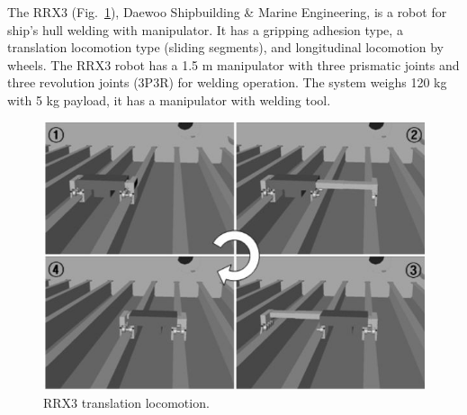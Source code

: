 The RRX3 (Fig.~\ref{rrx3}), Daewoo Shipbuilding \& Marine Engineering, is a
robot for ship's hull welding with manipulator. It has a gripping adhesion
type, a translation locomotion type (sliding segments), and
longitudinal locomotion by wheels. The RRX3 robot has a 1.5 m manipulator with
three prismatic joints and three revolution joints  (3P3R) for welding operation. The system weighs 120 kg with 5
kg payload, it has a manipulator with welding tool.


\begin{figure}[ht]
\centering
\includegraphics[scale=0.25]{figs/climbers/RRX3_moving.jpg}
\caption{RRX3 translation locomotion.}
\label{rrx3}
\end{figure}


